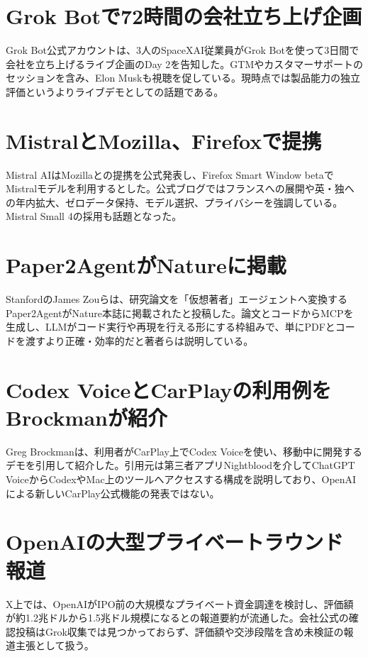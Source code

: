 \section{Grok Botで72時間の会社立ち上げ企画}
Grok Bot公式アカウントは、3人のSpaceXAI従業員がGrok Botを使って3日間で会社を立ち上げるライブ企画のDay 2を告知した。GTMやカスタマーサポートのセッションを含み、Elon Muskも視聴を促している。現時点では製品能力の独立評価というよりライブデモとしての話題である。

\section{MistralとMozilla、Firefoxで提携}
Mistral AIはMozillaとの提携を公式発表し、Firefox Smart Window betaでMistralモデルを利用するとした。公式ブログではフランスへの展開や英・独への年内拡大、ゼロデータ保持、モデル選択、プライバシーを強調している。Mistral Small 4の採用も話題となった。

\section{Paper2AgentがNatureに掲載}
StanfordのJames Zouらは、研究論文を「仮想著者」エージェントへ変換するPaper2AgentがNature本誌に掲載されたと投稿した。論文とコードからMCPを生成し、LLMがコード実行や再現を行える形にする枠組みで、単にPDFとコードを渡すより正確・効率的だと著者らは説明している。

\section{Codex VoiceとCarPlayの利用例をBrockmanが紹介}
Greg Brockmanは、利用者がCarPlay上でCodex Voiceを使い、移動中に開発するデモを引用して紹介した。引用元は第三者アプリNightbloodを介してChatGPT VoiceからCodexやMac上のツールへアクセスする構成を説明しており、OpenAIによる新しいCarPlay公式機能の発表ではない。

\section{OpenAIの大型プライベートラウンド報道}
X上では、OpenAIがIPO前の大規模なプライベート資金調達を検討し、評価額が約1.2兆ドルから1.5兆ドル規模になるとの報道要約が流通した。会社公式の確認投稿はGrok収集では見つかっておらず、評価額や交渉段階を含め未検証の報道主張として扱う。

